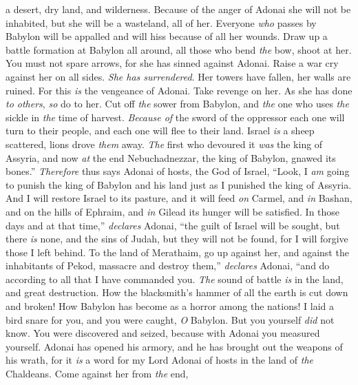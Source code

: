 \begin{biblechapter}
a desert, dry land, and wilderness.
\verse Because of the anger of Adonai she will not be inhabited, 
but she will be a wasteland, all of her. 
Everyone \textit{who} passes by Babylon will be appalled 
and will hiss because of all her wounds.
\verse Draw up a battle formation at Babylon all around, 
all those who bend \textit{the} bow, shoot at her. 
You must not spare arrows, 
for she has sinned against Adonai.
\verse Raise a war cry against her on all sides. 
\textit{She has surrendered}. 
Her towers have fallen, 
her walls are ruined. 
For this \textit{is} the vengeance of Adonai. 
Take revenge on her. 
As she has done \textit{to others}, 
\textit{so} do to her.
\verse Cut off \textit{the} sower from Babylon, 
and \textit{the} one who uses \textit{the} sickle in \textit{the} time of harvest. 
\textit{Because of} the sword of the oppressor 
each one will turn to their people, 
and each one will flee to their land.
\verse Israel \textit{is} a sheep scattered, 
lions drove \textit{them} away. 
\textit{The} first who devoured it \textit{was} the king of Assyria, 
and now \textit{at} the end Nebuchadnezzar, the king of Babylon, gnawed its bones.”
\verse \textit{Therefore} thus says Adonai of hosts, the God of Israel,
\verse “Look, I \textit{am} going to punish the king of Babylon and his land 
just as I punished the king of Assyria.
\verse And I will restore Israel to its pasture, 
and it will feed \textit{on} Carmel, and \textit{in} Bashan, 
and on the hills of Ephraim, and \textit{in} Gilead 
its hunger will be satisfied.
\verse In those days and at that time,” \textit{declares} Adonai, 
“the guilt of Israel will be sought, but there \textit{is} none, 
and the sins of Judah, but they will not be found, 
for I will forgive those I left behind.
\verse To the land of Merathaim, 
go up against her, 
and against the inhabitants of Pekod, 
massacre and destroy them,” \textit{declares} Adonai, 
“and do according to all that I have commanded you.
\verse \textit{The} sound of battle \textit{is} in the land, 
and great destruction.
\verse How the blacksmith’s hammer of all the earth is cut down and broken! 
How Babylon has become as a horror among the nations!
\verse I laid a bird snare for you, and you were caught, \textit{O} Babylon. 
But you yourself \textit{did} not know. 
You were discovered and seized, 
because with Adonai you measured yourself.
\verse Adonai has opened his armory, 
and he has brought out the weapons of his wrath, 
for it \textit{is} a word for my Lord Adonai of hosts 
in the land of \textit{the} Chaldeans.
\verse Come against her from \textit{the} end, 

\end{biblechapter}
